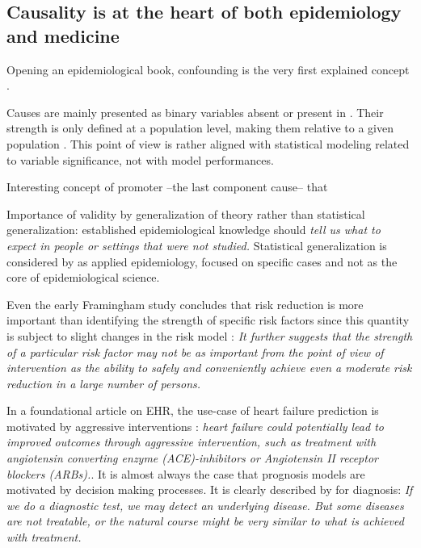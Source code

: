 \documentclass[french,12pt,twoside,a4paper]{book}
\begin{document}
\begin{background_box_left}

  \subsection{Causality is at the heart of both epidemiology and medicine}\label{subsec:intro:causation_epidemio}

  Opening an epidemiological book, confounding is the very first explained concept
  \citep{rothman2012epidemiology}.

  Causes are mainly presented as binary variables absent or present in \citep{}.
  Their strength is only defined at a population level, making them relative to a
  given population \citep[chapter~3]{rothman2012epidemiology}. This point of
  view is rather aligned with statistical modeling related to variable
  significance, not with model performances.

  Interesting concept of promoter --the last component cause-- that

  Importance of validity by generalization of theory rather than statistical
  generalization: established epidemiological knowledge should \textit{tell us
    what to expect in people or settings that were not studied.} Statistical
  generalization is considered by \cite{rothman2012epidemiology} as applied
  epidemiology, focused on specific cases and not as the core of epidemiological
  science.

  Even the early Framingham study concludes that risk reduction is more important
  than identifying the strength of specific risk factors since this quantity is
  subject to slight changes in the risk model \citep{brand1976multivariate}:
  \textit{It further suggests that the strength of a particular risk factor may
    not be as important from the point of view of intervention as the ability to
    safely and conveniently achieve even a moderate risk reduction in a large number
    of persons.}

  In a foundational article on EHR, the use-case of heart failure prediction is
  motivated by aggressive interventions \citep{wu2010prediction}: \textit{heart
    failure could potentially lead to improved outcomes through aggressive
    intervention, such as treatment with angiotensin converting enzyme
    (ACE)-inhibitors or Angiotensin II receptor blockers (ARBs).}. It is almost
  always the case that prognosis models are motivated by decision making
  processes. It is clearly described by \cite{steyerberg2009applications} for
  diagnosis: \textit{If we do a diagnostic test, we may detect an underlying
    disease. But some diseases are not treatable, or the natural course might be
    very similar to what is achieved with treatment.}



\end{background_box_left}
\end{document}
